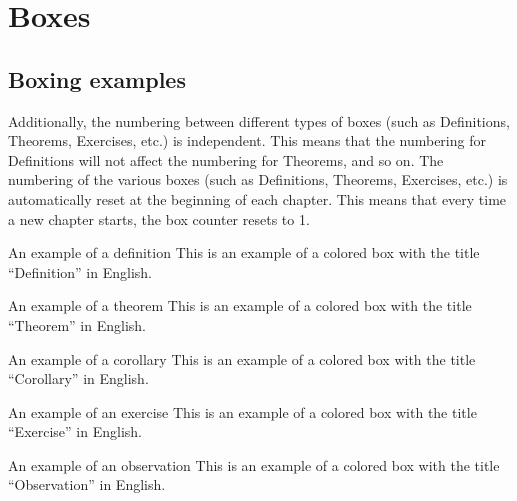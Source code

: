 \chapter{Boxes}
\section{Boxing examples}

Additionally, the numbering between different types of boxes (such as Definitions, Theorems, Exercises, etc.) is independent. This means that the numbering for Definitions will not affect the numbering for Theorems, and so on.
The numbering of the various boxes (such as Definitions, Theorems, Exercises, etc.) is automatically reset at the beginning of each chapter. This means that every time a new chapter starts, the box counter resets to 1.

\begin{definition}{An example of a definition}
  This is an example of a colored box with the title ``Definition'' in English.
\end{definition}

\begin{theorem}{An example of a theorem}
  This is an example of a colored box with the title ``Theorem'' in English.
\end{theorem}

\begin{corollary}{An example of a corollary}
  This is an example of a colored box with the title ``Corollary'' in English.
\end{corollary}

\begin{exercise}{An example of an exercise}
  This is an example of a colored box with the title ``Exercise'' in English.
\end{exercise}

\begin{observation}{An example of an observation}
  This is an example of a colored box with the title ``Observation'' in English.
\end{observation}
